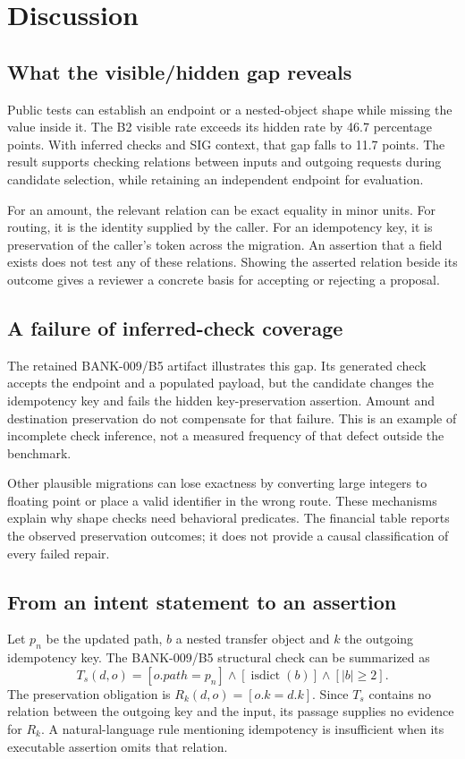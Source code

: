 \section{Discussion}
\subsection{What the visible/hidden gap reveals}
Public tests can establish an endpoint or a nested-object shape while missing the value inside it. The B2 visible rate exceeds its hidden rate by 46.7 percentage points. With inferred checks and SIG context, that gap falls to 11.7 points. The result supports checking relations between inputs and outgoing requests during candidate selection, while retaining an independent endpoint for evaluation.

For an amount, the relevant relation can be exact equality in minor units. For routing, it is the identity supplied by the caller. For an idempotency key, it is preservation of the caller's token across the migration. An assertion that a field exists does not test any of these relations. Showing the asserted relation beside its outcome gives a reviewer a concrete basis for accepting or rejecting a proposal.

\subsection{A failure of inferred-check coverage}
The retained BANK-009/B5 artifact illustrates this gap. Its generated check accepts the endpoint and a populated payload, but the candidate changes the idempotency key and fails the hidden key-preservation assertion. Amount and destination preservation do not compensate for that failure. This is an example of incomplete check inference, not a measured frequency of that defect outside the benchmark.

Other plausible migrations can lose exactness by converting large integers to floating point or place a valid identifier in the wrong route. These mechanisms explain why shape checks need behavioral predicates. The financial table reports the observed preservation outcomes; it does not provide a causal classification of every failed repair.

\ifAccess
\subsection{From an intent statement to an assertion}
Let $p_n$ be the updated path, $b$ a nested transfer object and $k$ the outgoing idempotency key. The BANK-009/B5 structural check can be summarized as
\begin{equation}
T_s(d,o)=[o.path=p_n]\land[\operatorname{isdict}(b)]\land[|b|\ge2].
\end{equation}
The preservation obligation is $R_k(d,o)=[o.k=d.k]$. Since $T_s$ contains no relation between the outgoing key and the input, its passage supplies no evidence for $R_k$. A natural-language rule mentioning idempotency is insufficient when its executable assertion omits that relation.

